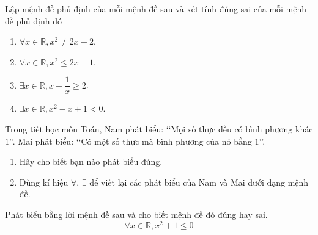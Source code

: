\begin{bt}%
	Lập mệnh đề phủ định của mỗi mệnh đề sau và xét tính đúng sai của mỗi mệnh đề phủ định đó
	\begin{enumerate}
		\item $\forall x \in \mathbb{R}, x^2 \neq 2x-2$.
		\item $\forall x \in \mathbb{R}, x^2 \leq 2x-1$.
		\item $\exists x \in \mathbb{R}, x+\dfrac{1}{x} \geq 2$.
		\item $\exists x \in \mathbb{R}, x^2-x+1<0$.
	\end{enumerate}
\end{bt}
\begin{bt}%
	Trong tiết học môn Toán, Nam phát biểu: \lq\lq  Mọi số thực đều có bình phương khác $1$\rq\rq. Mai phát biểu: \lq\lq  Có một số thực mà bình phương của nó bằng $1$\rq\rq.
	\begin{enumerate}
		\item Hãy cho biết bạn nào phát biểu đúng.
		\item Dùng kí hiệu $\forall$, $\exists$ để viết lại các phát biểu của Nam và Mai dưới dạng mệnh đề.
	\end{enumerate}
\end{bt}
\begin{bt}%
	Phát biểu bằng lời mệnh đề sau và cho biết mệnh đề đó đúng hay sai.
	$$
	\forall x \in \mathbb{R}, x^2+1 \leq 0
	$$
\end{bt}


